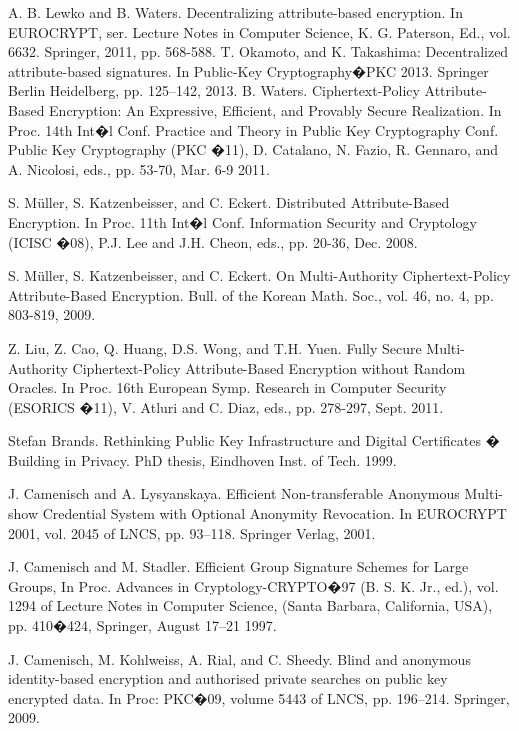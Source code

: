 \documentclass[10pt,journal]{IEEEtran}
\begin{document}
\begin{thebibliography}{5}
A. B. Lewko and B. Waters. Decentralizing attribute-based encryption. In EUROCRYPT, ser. Lecture Notes in Computer Science, K. G. Paterson, Ed., vol. 6632. Springer, 2011, pp. 568-588.
T. Okamoto, and K. Takashima: Decentralized attribute-based signatures. In Public-Key Cryptography�PKC 2013. Springer Berlin Heidelberg, pp. 125--142, 2013.
B. Waters. Ciphertext-Policy Attribute-Based Encryption: An Expressive, Efficient, and Provably Secure Realization. In Proc. 14th
Int�l Conf. Practice and Theory in Public Key Cryptography Conf. Public Key Cryptography (PKC �11), D. Catalano, N. Fazio,
R. Gennaro, and A. Nicolosi, eds., pp. 53-70, Mar. 6-9 2011.

S. M\"{u}ller, S. Katzenbeisser, and C. Eckert. Distributed Attribute-Based Encryption. In Proc. 11th Int�l Conf. Information Security and
Cryptology (ICISC �08), P.J. Lee and J.H. Cheon, eds., pp. 20-36, Dec. 2008.

S. M\"{u}ller, S. Katzenbeisser, and C. Eckert. On Multi-Authority Ciphertext-Policy Attribute-Based Encryption. Bull. of the Korean
Math. Soc., vol. 46, no. 4, pp. 803-819, 2009.

Z. Liu, Z. Cao, Q. Huang, D.S. Wong, and T.H. Yuen. Fully Secure Multi-Authority Ciphertext-Policy Attribute-Based Encryption
without Random Oracles. In Proc. 16th European Symp. Research in Computer Security (ESORICS �11), V. Atluri and C. Diaz, eds., pp. 278-297, Sept. 2011.

Stefan Brands. Rethinking Public Key Infrastructure and Digital Certificates � Building in Privacy. PhD thesis, Eindhoven Inst. of Tech. 1999.

J. Camenisch and A. Lysyanskaya. Efficient Non-transferable Anonymous Multi-show Credential System with Optional Anonymity Revocation. In
EUROCRYPT 2001, vol. 2045 of LNCS, pp. 93--118. Springer Verlag, 2001.

J. Camenisch and M. Stadler. Efficient Group Signature Schemes for Large Groups, In Proc. Advances in Cryptology-CRYPTO�97 (B. S. K. Jr., ed.), vol. 1294 of Lecture Notes in Computer Science, (Santa Barbara, California, USA), pp. 410�424, Springer,
August 17--21 1997.

 J. Camenisch, M. Kohlweiss, A. Rial, and C. Sheedy. Blind and anonymous identity-based encryption and authorised private searches on public key encrypted data. In Proc: PKC�09, volume 5443 of LNCS, pp. 196--214. Springer, 2009.


\end{thebibliography}
\end{document}
